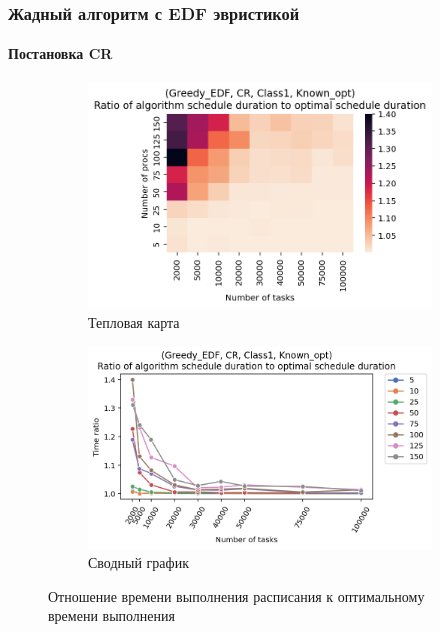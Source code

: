 \subsubsection{Жадный алгоритм с EDF эвристикой}

\paragraph{Постановка CR}

\begin{figure}[!htbp]
    \centering
    \begin{subfigure}{0.49\textwidth}
        \includegraphics[width=\textwidth]{imgs/ideal_1/CR_EDF/th.png}
        \caption{Тепловая карта}
        \label{fig:CR-EDF-times-heatmap}
    \end{subfigure}
    \hfill
    \begin{subfigure}{0.49\textwidth}
        \includegraphics[width=\textwidth]{imgs/ideal_1/CR_EDF/gr_amalgamated.png}
        \caption{Сводный график} 
        \label{fig:CR-EDF-times-compiled} 
    \end{subfigure}
    \caption{Отношение времени выполнения расписания к оптимальному времени выполнения}
\end{figure}

